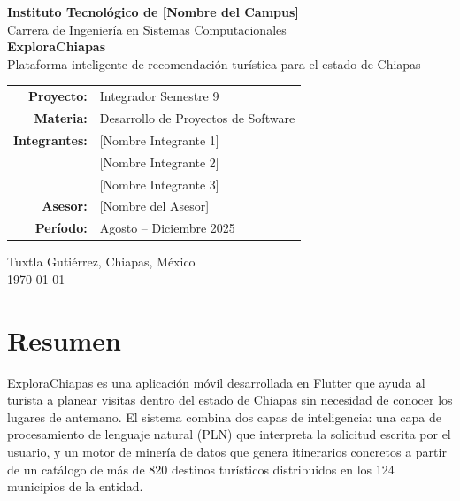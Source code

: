 \documentclass[12pt,letterpaper]{report}
\begin{document}

\begin{titlepage}
\centering
\vspace*{1cm}


{\Large \textbf{Instituto Tecnológico de [Nombre del Campus]}\\
Carrera de Ingeniería en Sistemas Computacionales}\\[2cm]

{\Huge \textbf{ExploraChiapas}}\\[0.5cm]
{\large Plataforma inteligente de recomendación turística para el estado de Chiapas}\\[2cm]

\begin{tabular}{rl}
\textbf{Proyecto:} & Integrador Semestre 9 \\[4pt]
\textbf{Materia:}  & Desarrollo de Proyectos de Software \\[4pt]
\textbf{Integrantes:} & [Nombre Integrante 1] \\
                       & [Nombre Integrante 2] \\
                       & [Nombre Integrante 3] \\[4pt]
\textbf{Asesor:}   & [Nombre del Asesor] \\[4pt]
\textbf{Período:}  & Agosto – Diciembre 2025 \\
\end{tabular}

\vfill
{\normalsize Tuxtla Gutiérrez, Chiapas, México}\\
{\normalsize \today}
\end{titlepage}

\chapter*{Resumen}

ExploraChiapas es una aplicación móvil desarrollada en Flutter que ayuda al turista a planear
visitas dentro del estado de Chiapas sin necesidad de conocer los lugares de antemano.
El sistema combina dos capas de inteligencia: una capa de procesamiento de lenguaje natural (PLN)
que interpreta la solicitud escrita por el usuario, y un motor de minería de datos que genera
itinerarios concretos a partir de un catálogo de más de 820 destinos turísticos distribuidos
en los 124 municipios de la entidad.
\end{document}
